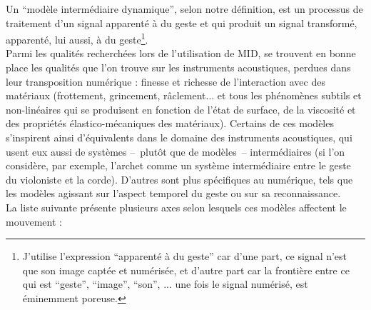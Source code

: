 \noindent Un ``modèle intermédiaire dynamique'', selon notre définition, est un processus de traitement d'un signal apparenté à du geste et qui produit un signal transformé, apparenté, lui aussi, à du geste\footnote{J'utilise l'expression ``apparenté à du geste'' car d'une part, ce signal n'est que son image captée et numérisée, et d'autre part car la frontière entre ce qui est ``geste'', ``image'', ``son'', ... une fois le signal numérisé, est éminemment poreuse.}.\\
\indent Parmi les qualités recherchées lors de l'utilisation de MID, se trouvent en bonne place les qualités que l'on trouve sur les instruments acoustiques, perdues dans leur transposition numérique : finesse et richesse de l'interaction avec des matériaux (frottement, grincement, râclement... et tous les phénomènes subtils et non-linéaires qui se produisent en fonction de l'état de surface, de la viscosité et des propriétés élastico-mécaniques des matériaux). Certains de ces modèles s'inspirent ainsi d'équivalents dans le domaine des instruments acoustiques, qui usent eux aussi de systèmes --~plutôt que de modèles~-- intermédiaires (si l'on considère, par exemple, l'archet comme un système intermédiaire entre le geste du violoniste et la corde). D'autres sont plus spécifiques au numérique, tels que les modèles agissant sur l'aspect temporel du geste ou sur sa reconnaissance.\\
\indent La liste suivante présente plusieurs axes selon lesquels ces modèles affectent le mouvement :
\vspace{-1em}
